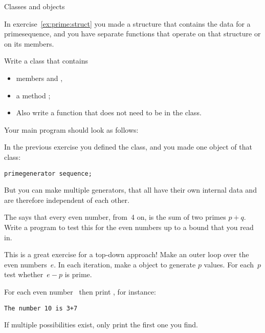  {Classes and objects}

\prerequisite{\ref{sec:object}}

In exercise~\ref{ex:prime:struct} you made a structure that contains
the data for a primesequence, and you have separate functions that
operate on that structure or on its members.

\begin{exercise}
  \label{ex:prime:sequence}
  Write a class  that contains 
  \begin{itemize}
  \item members   and
    ,
  \item a method ;
  \item Also write a function  that does not need to be
    in the class.
  \end{itemize}

  Your main program should look as follows:
\end{exercise}

In the previous exercise you defined the  class, and
you made one object of that class:
\begin{lstlisting}
primegenerator sequence;
\end{lstlisting}
But you can make multiple generators, that all have their own internal
data and are therefore independent of each other.

\begin{exercise}
  \label{ex:goldbach:conj}
  The  says that every even number,
  from~4 on, is the sum of two primes $p+q$. Write a program to test this
  for the even numbers up to a bound that you read in.

  This is a great exercise for a top-down approach!
  Make an outer loop over the even numbers~$e$. In each iteration,
  make a  object to generate $p$ values.
  For each~$p$ test whether~$e-p$ is prime.

  For each even number~ then print , for instance:
  \begin{verbatim}
The number 10 is 3+7
  \end{verbatim}
  If multiple possibilities exist, only print the first one you find.
\end{exercise}

